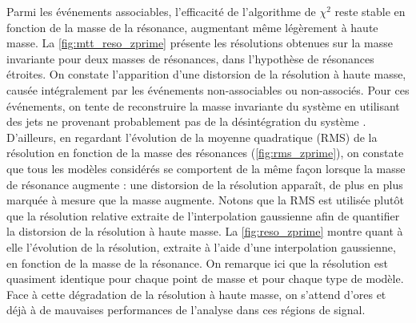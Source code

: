 Parmi les événements associables, l'efficacité de l'algorithme de $\chi^2$ reste stable en fonction de la masse de la résonance, augmentant même légèrement à haute masse. La \cref{fig:mtt_reso_zprime} présente les résolutions obtenues sur la masse invariante pour deux masses de résonances, dans l'hypothèse de résonances étroites. On constate l'apparition d'une distorsion de la résolution à haute masse, causée intégralement par les événements non-associables ou non-associés. Pour ces événements, on tente de reconstruire la masse invariante du système \ttbar en utilisant des jets ne provenant probablement pas de la désintégration du système \ttbar. D'ailleurs, en regardant l'évolution de la moyenne quadratique (RMS) de la résolution en fonction de la masse des résonances (\cref{fig:rms_zprime}), on constate que tous les modèles considérés se comportent de la même façon lorsque la masse de résonance augmente : une distorsion de la résolution apparaît, de plus en plus marquée à mesure que la masse augmente. Notons que la RMS est utilisée plutôt que la résolution relative extraite de l'interpolation gaussienne afin de quantifier la distorsion de la résolution à haute masse. La \cref{fig:reso_zprime} montre quant à elle l'évolution de la résolution, extraite à l'aide d'une interpolation gaussienne, en fonction de la masse de la résonance. On remarque ici que la résolution est quasiment identique pour chaque point de masse et pour chaque type de modèle. Face à cette dégradation de la résolution à haute masse, on s'attend d'ores et déjà à de mauvaises performances de l'analyse dans ces régions de signal.

